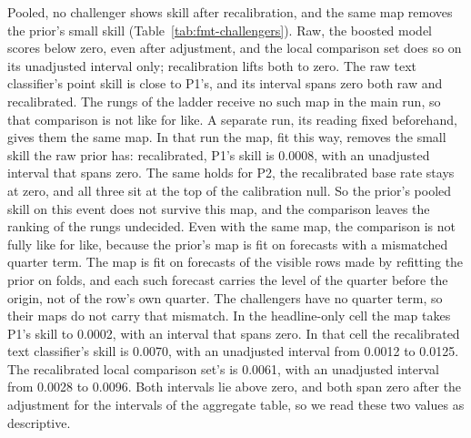 Pooled, no challenger shows skill after recalibration, and the same map removes the prior's small skill (Table~\ref{tab:fmt-challengers}). Raw, the boosted model scores below zero, even after adjustment, and the local comparison set does so on its unadjusted interval only; recalibration lifts both to zero. The raw text classifier's point skill is close to P1's, and its interval spans zero both raw and recalibrated. The rungs of the ladder receive no such map in the main run, so that comparison is not like for like. A separate run, its reading fixed beforehand, gives them the same map.
In that run the map, fit this way, removes the small skill the raw prior has: recalibrated, P1's skill is 0.0008, with an unadjusted interval that spans zero. The same holds for P2, the recalibrated base rate stays at zero, and all three sit at the top of the calibration null. So the prior's pooled skill on this event does not survive this map, and the comparison leaves the ranking of the rungs undecided.
Even with the same map, the comparison is not fully like for like, because the prior's map is fit on forecasts with a mismatched quarter term. The map is fit on forecasts of the visible rows made by refitting the prior on folds, and each such forecast carries the level of the quarter before the origin, not of the row's own quarter. The challengers have no quarter term, so their maps do not carry that mismatch. In the headline-only cell the map takes P1's skill to 0.0002, with an interval that spans zero. In that cell the recalibrated text classifier's skill is 0.0070, with an unadjusted interval from 0.0012 to 0.0125. The recalibrated local comparison set's is 0.0061, with an unadjusted interval from 0.0028 to 0.0096. Both intervals lie above zero, and both span zero after the adjustment for the intervals of the aggregate table, so we read these two values as descriptive.
